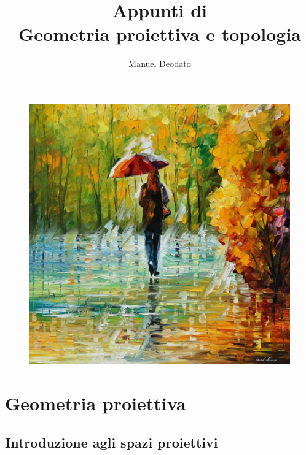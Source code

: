 \documentclass[12pt]{scrartcl}
\title{Appunti di\\ \vspace{.3cm} Geometria proiettiva e topologia}
\author{Manuel Deodato}
\date{}
\theoremstyle{style}
\renewcommand{\maketitle}{
\begin{center}
{\sffamily
{\fontsize{20}{20}\selectfont\MakeUppercase\thetitle}}

\vspace{0.2in}

{\large\scshape\theauthor}
\end{center}
}
\numberwithin{equation}{subsection}
\begin{document}
\pagestyle{plain}
\maketitle
\vspace{6cm}
\begin{figure}[h!]
	\centering
	\includegraphics[width=.7\columnwidth]{front1.jpeg}
\end{figure}

\newpage
\tableofcontents 
\newpage
\section{Geometria proiettiva}

\subsection{Introduzione agli spazi proiettivi}
\end{document}
